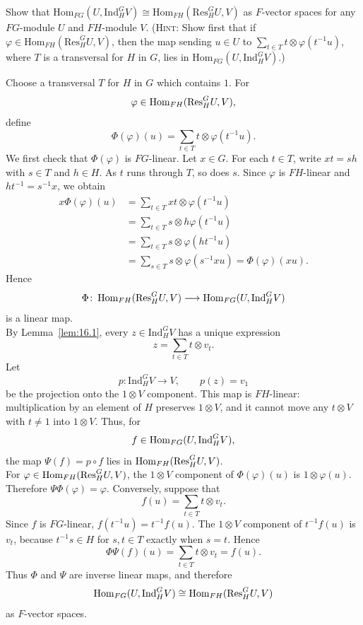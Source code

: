 \documentclass[../Odyssey_Project.tex]{subfiles}
\begin{document}
\begin{exercise}
\label{ex:16.3}
Show that $\mathrm{Hom}_{FG}(U, \mathrm{Ind}_H^G V) \cong \mathrm{Hom}_{FH}(\mathrm{Res}_H^G U, V)$ as $F$-vector spaces for any $FG$-module $U$ and $FH$-module $V$. (\textsc{Hint}: Show first that if $\varphi \in \mathrm{Hom}_{FH}(\mathrm{Res}_H^G U, V)$, then the map sending $u \in U$ to $\sum_{t \in T} t \otimes \varphi(t^{-1} u)$, where $T$ is a transversal for $H$ in $G$, lies in $\mathrm{Hom}_{FG}(U, \mathrm{Ind}_H^G V)$.)
\end{exercise}
\begin{solution}
    Choose a transversal $T$ for $H$ in $G$ which contains $1$. For
    \[
        \varphi\in\operatorname{Hom}_{FH}(\mathrm{Res}_H^G U,V),
    \]
    define
    \[
        \Phi(\varphi)(u)
        =
        \sum_{t\in T}t\otimes\varphi(t^{-1}u).
    \]
    We first check that $\Phi(\varphi)$ is $FG$-linear. Let $x\in G$. For each $t\in T$, write $xt=sh$ with $s\in T$ and $h\in H$. As $t$ runs through $T$, so does $s$. Since $\varphi$ is $FH$-linear and $ht^{-1}=s^{-1}x$, we obtain
    \begin{align*}
        x\Phi(\varphi)(u)
        &=
        \sum_{t\in T}xt\otimes\varphi(t^{-1}u) \\
        &=
        \sum_{t\in T}s\otimes h\varphi(t^{-1}u) \\
        &=
        \sum_{t\in T}s\otimes\varphi(ht^{-1}u) \\
        &=
        \sum_{s\in T}s\otimes\varphi(s^{-1}xu)
        =
        \Phi(\varphi)(xu).
    \end{align*}
    Hence
    \[
        \Phi\colon
        \operatorname{Hom}_{FH}(\mathrm{Res}_H^G U,V)
        \longrightarrow
        \operatorname{Hom}_{FG}(U,\mathrm{Ind}_H^G V)
    \]
    is a linear map.\\
    By Lemma~\ref{lem:16.1}, every $z\in\mathrm{Ind}_H^G V$ has a unique expression
    \[
        z=\sum_{t\in T}t\otimes v_t.
    \]
    Let
    \[
        p\colon\mathrm{Ind}_H^G V\to V,
        \qquad
        p(z)=v_1
    \]
    be the projection onto the $1\otimes V$ component. This map is $FH$-linear: multiplication by an element of $H$ preserves $1\otimes V$, and it cannot move any $t\otimes V$ with $t\neq1$ into $1\otimes V$. Thus, for
    \[
        f\in\operatorname{Hom}_{FG}(U,\mathrm{Ind}_H^G V),
    \]
    the map $\Psi(f)=p\circ f$ lies in $\operatorname{Hom}_{FH}(\mathrm{Res}_H^G U,V)$.\\
    For $\varphi\in\operatorname{Hom}_{FH}(\mathrm{Res}_H^G U,V)$, the $1\otimes V$ component of $\Phi(\varphi)(u)$ is $1\otimes\varphi(u)$. Therefore $\Psi\Phi(\varphi)=\varphi$. Conversely, suppose that
    \[
        f(u)=\sum_{t\in T}t\otimes v_t.
    \]
    Since $f$ is $FG$-linear, $f(t^{-1}u)=t^{-1}f(u)$. The $1\otimes V$ component of $t^{-1}f(u)$ is $v_t$, because $t^{-1}s\in H$ for $s,t\in T$ exactly when $s=t$. Hence
    \[
        \Phi\Psi(f)(u)
        =
        \sum_{t\in T}t\otimes v_t
        =
        f(u).
    \]
    Thus $\Phi$ and $\Psi$ are inverse linear maps, and therefore
    \[
        \operatorname{Hom}_{FG}(U,\mathrm{Ind}_H^G V)
        \cong
        \operatorname{Hom}_{FH}(\mathrm{Res}_H^G U,V)
    \]
    as $F$-vector spaces.
\end{solution}
\end{document}
